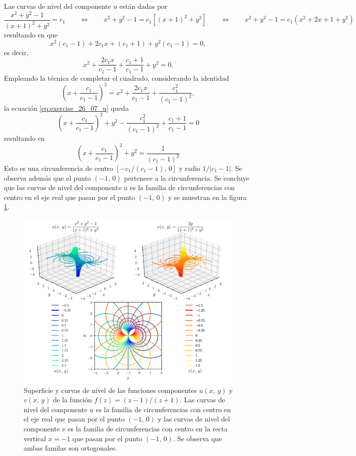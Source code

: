 \documentclass[a4paper]{report}
\begin{document}
Las curvas de nivel del componente \(u\) están dadas por 
\[
 \frac{x^2+y^2-1}{(x+1)^2+y^2}=c_1
 \qquad\Leftrightarrow\qquad
 x^2+y^2-1=c_1[(x+1)^2+y^2]
 \qquad\Leftrightarrow\qquad
 x^2+y^2-1=c_1(x^2+2x+1+y^2)
\]
resultando en que 
\[
 x^2(c_1-1)+2c_1x+(c_1+1)+y^2(c_1-1)=0,
\]
es decir,
\begin{equation}\label{eq:exercise_26_07_u}
 x^2+\frac{2c_1x}{c_1-1}+\frac{c_1+1}{c_1-1}+y^2=0.
\end{equation}
Empleando la técnica de completar el cuadrado, considerando la identidad 
\[
 \left(x+\frac{c_1}{c_1-1}\right)^2=x^2+\frac{2c_1x}{c_1-1}+\frac{c_1^2}{(c_1-1)^2},
\]
la ecuación \ref{eq:exercise_26_07_u} queda 
\[
 \left(x+\frac{c_1}{c_1-1}\right)^2+y^2-\frac{c_1^2}{(c_1-1)^2}+\frac{c_1+1}{c_1-1}=0
\]
resultando en
\[
 \left(x+\frac{c_1}{c_1-1}\right)^2+y^2=\frac{1}{(c_1-1)^2}
\]
Esto es una circunferencia de centro \([-c_1/(c_1-1),\,0]\) y radio \(1/|c_1-1|\). Se observa además que el punto \((-1,\,0)\) pertenece a la circunferencia. Se concluye que las curvas de nivel del componente \(u\) es la familia de circunferencias con centro en el eje real que pasan por el punto \((-1,\,0)\) y se muestran en la figura \ref{fig:exercise_27_6}.
\begin{figure}[!htb]
 \begin{center}
 \includegraphics[width=\textwidth]{figuras/exercise_27_6.pdf}
 \caption{\label{fig:exercise_27_6} Superficie y curvas de nivel de las funciones componentes \(u(x,\,y)\) y \(v(x,\,y)\) de la función \(f(z)=(z-1)/(z+1)\). Las curvas de nivel del componente \(u\) es la familia de circunferencias con centro en el eje real que pasan por el punto \((-1,\,0)\) y las curvas de nivel del componente \(v\) es la familia de circunferencias con centro en la recta vertical \(x=-1\) que pasan por el punto \((-1,\,0)\). Se observa que ambas familas son ortogonales.}
 \end{center}
\end{figure}
\end{document}
